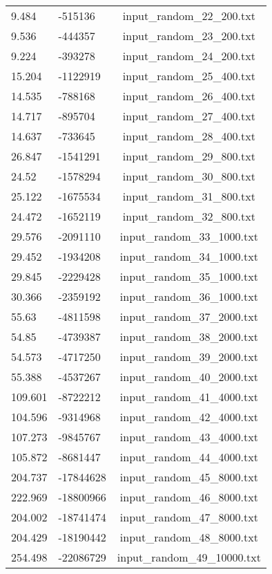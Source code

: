 \begin{longtable}[hb]{|l|l|c|}
    9.484 & -515136 & input\_random\_22\_200.txt \\
    9.536 & -444357 & input\_random\_23\_200.txt \\
    9.224 & -393278 & input\_random\_24\_200.txt \\
    15.204 & -1122919 & input\_random\_25\_400.txt \\
    14.535 & -788168 & input\_random\_26\_400.txt \\
    14.717 & -895704 & input\_random\_27\_400.txt \\
    14.637 & -733645 & input\_random\_28\_400.txt \\
    26.847 & -1541291 & input\_random\_29\_800.txt \\
    24.52 & -1578294 & input\_random\_30\_800.txt \\
    25.122 & -1675534 & input\_random\_31\_800.txt \\
    24.472 & -1652119 & input\_random\_32\_800.txt \\
    29.576 & -2091110 & input\_random\_33\_1000.txt \\
    29.452 & -1934208 & input\_random\_34\_1000.txt \\
    29.845 & -2229428 & input\_random\_35\_1000.txt \\
    30.366 & -2359192 & input\_random\_36\_1000.txt \\
    55.63 & -4811598 & input\_random\_37\_2000.txt \\
    54.85 & -4739387 & input\_random\_38\_2000.txt \\
    54.573 & -4717250 & input\_random\_39\_2000.txt \\
    55.388 & -4537267 & input\_random\_40\_2000.txt \\
    109.601 & -8722212 & input\_random\_41\_4000.txt \\
    104.596 & -9314968 & input\_random\_42\_4000.txt \\
    107.273 & -9845767 & input\_random\_43\_4000.txt \\
    105.872 & -8681447 & input\_random\_44\_4000.txt \\
    204.737 & -17844628 & input\_random\_45\_8000.txt \\
    222.969 & -18800966 & input\_random\_46\_8000.txt \\
    204.002 & -18741474 & input\_random\_47\_8000.txt \\
    204.429 & -18190442 & input\_random\_48\_8000.txt \\
    254.498 & -22086729 & input\_random\_49\_10000.txt \\

\end{longtable}
